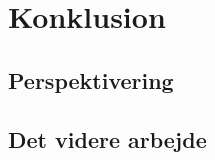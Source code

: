 \chapter{Konklusion}


\section{Perspektivering}

\section{Det videre arbejde}
\label{VidereArbejde}
